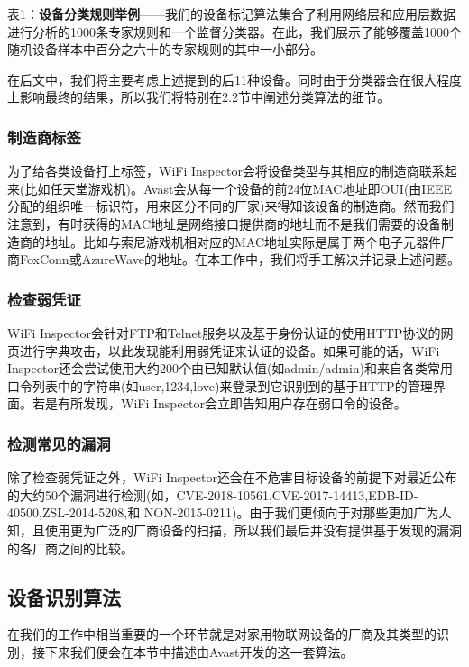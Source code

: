 \documentclass[UTF8]{ctexart}
\begin{document}
	\begin{center}
		表1：\textbf{设备分类规则举例}——我们的设备标记算法集合了利用网络层和应用层数据进行分析的1000条专家规则和一个监督分类器。在此，我们展示了能够覆盖1000个随机设备样本中百分之六十的专家规则的其中一小部分。
	\end{center}
	
	在后文中，我们将主要考虑上述提到的后11种设备。同时由于分类器会在很大程度上影响最终的结果，所以我们将特别在2.2节中阐述分类算法的细节。
	
	\subsubsection*{制造商标签}
	为了给各类设备打上标签，WiFi Inspector会将设备类型与其相应的制造商联系起来(比如任天堂游戏机)。Avast会从每一个设备的前24位MAC地址即OUI(由IEEE分配的组织唯一标识符，用来区分不同的厂家)来得知该设备的制造商。然而我们注意到，有时获得的MAC地址是网络接口提供商的地址而不是我们需要的设备制造商的地址。比如与索尼游戏机相对应的MAC地址实际是属于两个电子元器件厂商FoxConn或AzureWave的地址。在本工作中，我们将手工解决并记录上述问题。
	
	\subsubsection*{检查弱凭证}
	WiFi Inspector会针对FTP和Telnet服务以及基于身份认证的使用HTTP协议的网页进行字典攻击，以此发现能利用弱凭证来认证的设备。如果可能的话，WiFi Inspector还会尝试使用大约200个由已知默认值(如admin/admin)和来自各类常用口令列表中的字符串(如user,1234,love)来登录到它识别到的基于HTTP的管理界面。若是有所发现，WiFi Inspector会立即告知用户存在弱口令的设备。
	
	\subsubsection*{检测常见的漏洞}
	除了检查弱凭证之外，WiFi Inspector还会在不危害目标设备的前提下对最近公布的大约50个漏洞进行检测(如，CVE-2018-10561,CVE-2017-14413,EDB-ID-40500,ZSL-2014-5208,和 NON-2015-0211)。由于我们更倾向于对那些更加广为人知，且使用更为广泛的厂商设备的扫描，所以我们最后并没有提供基于发现的漏洞的各厂商之间的比较。
	
	\subsection{设备识别算法}
	在我们的工作中相当重要的一个环节就是对家用物联网设备的厂商及其类型的识别，接下来我们便会在本节中描述由Avast开发的这一套算法。
	
\end{document}
